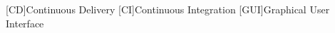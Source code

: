 \begin{acronym}[IEEE]
	[CD]{Continuous Delivery}
	[CI]{Continuous Integration}
	[GUI]{Graphical User Interface}
\end{acronym}
